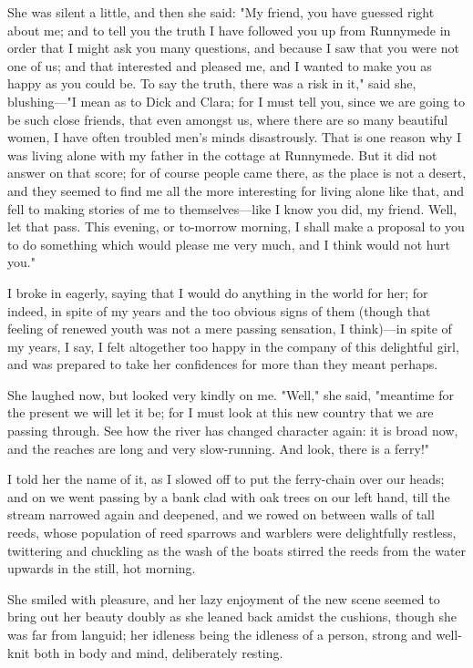 She was silent a little, and then she said: "My friend, you have guessed
right about me; and to tell you the truth I have followed you up from
Runnymede in order that I might ask you many questions, and because I
saw that you were not one of us; and that interested and pleased me, and
I wanted to make you as happy as you could be. To say the truth, there
was a risk in it," said she, blushing---"I mean as to Dick and Clara;
for I must tell you, since we are going to be such close friends, that
even amongst us, where there are so many beautiful women, I have often
troubled men's minds disastrously. That is one reason why I was living
alone with my father in the cottage at Runnymede. But it did not answer
on that score; for of course people came there, as the place is not a
desert, and they seemed to find me all the more interesting for living
alone like that, and fell to making stories of me to themselves---like I
know you did, my friend. Well, let that pass. This evening, or to-morrow
morning, I shall make a proposal to you to do something which would
please me very much, and I think would not hurt you."

I broke in eagerly, saying that I would do anything in the world for
her; for indeed, in spite of my years and the too obvious signs of them
(though that feeling of renewed youth was not a mere passing sensation,
I think)---in spite of my years, I say, I felt altogether too happy in
the company of this delightful girl, and was prepared to take her
confidences for more than they meant perhaps.

She laughed now, but looked very kindly on me. "Well," she said,
"meantime for the present we will let it be; for I must look at this new
country that we are passing through. See how the river has changed
character again: it is broad now, and the reaches are long and very
slow-running. And look, there is a ferry!"

I told her the name of it, as I slowed off to put the ferry-chain over
our heads; and on we went passing by a bank clad with oak trees on our
left hand, till the stream narrowed again and deepened, and we rowed on
between walls of tall reeds, whose population of reed sparrows and
warblers were delightfully restless, twittering and chuckling as the
wash of the boats stirred the reeds from the water upwards in the still,
hot morning.

She smiled with pleasure, and her lazy enjoyment of the new scene seemed
to bring out her beauty doubly as she leaned back amidst the cushions,
though she was far from languid; her idleness being the idleness of a
person, strong and well-knit both in body and mind, deliberately
resting.

